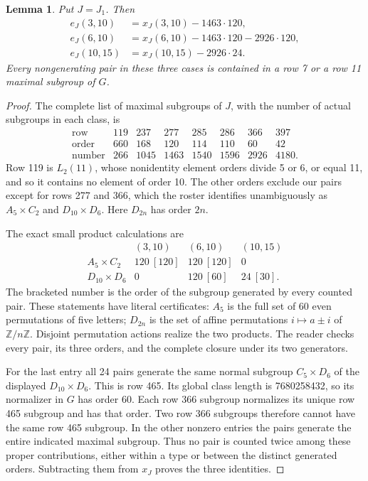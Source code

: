 \documentclass[11pt,a4paper]{article}
\newtheorem{lemma}{Lemma}\newtheorem{theorem}{Theorem}
\begin{document}
\begin{lemma}\label{j1}
Put $J=J_1$. Then
\[
\begin{aligned}
e_J(3,10)&=x_J(3,10)-1463\cdot120,\\
e_J(6,10)&=x_J(6,10)-1463\cdot120-2926\cdot120,\\
e_J(10,15)&=x_J(10,15)-2926\cdot24.
\end{aligned}
\]
Every nongenerating pair in these three cases is contained in a
row 7 or a row 11 maximal subgroup of $G$.
\end{lemma}
\begin{proof}
The complete list of maximal subgroups of $J$, with the number of
actual subgroups in each class, is
\[
\begin{array}{c|rrrrrrr}
\text{row}&119&237&277&285&286&366&397\\
\text{order}&660&168&120&114&110&60&42\\
\text{number}&266&1045&1463&1540&1596&2926&4180.
\end{array}
\]
Row 119 is $L_2(11)$, whose nonidentity element orders divide 5 or 6,
or equal 11, and so it contains no element of order 10. The other
orders exclude our pairs except for rows 277 and 366, which the
roster identifies unambiguously as $A_5\times C_2$ and
$D_{10}\times D_6$. Here $D_{2n}$ has order $2n$.

The exact small product calculations are
\[
\begin{array}{c|rrr}
 &(3,10)&(6,10)&(10,15)\\\hline
A_5\times C_2&120\ [120]&120\ [120]&0\\
D_{10}\times D_6&0&120\ [60]&24\ [30].
\end{array}
\]
The bracketed number is the order of the subgroup generated by
every counted pair. These statements have literal certificates:
$A_5$ is the full set of 60 even permutations of five letters;
$D_{2n}$ is the set of affine permutations $i\mapsto a\pm i$ of
$\mathbb Z/n\mathbb Z$. Disjoint permutation actions realize the
two products. The reader checks every pair, its three orders, and
the complete closure under its two generators.

For the last entry all 24 pairs generate the same normal subgroup
$C_5\times D_6$ of the displayed $D_{10}\times D_6$. This is row 465.
Its global class length is 7680258432, so its normalizer in $G$ has
order 60. Each row 366 subgroup normalizes its unique row 465
subgroup and has that order. Two row 366 subgroups therefore cannot
have the same row 465 subgroup. In the other nonzero entries the
pairs generate the entire indicated maximal subgroup. Thus no
pair is counted twice among these proper contributions, either
within a type or between the distinct generated orders. Subtracting
them from $x_J$ proves the three identities.


\end{proof}
\end{document}
